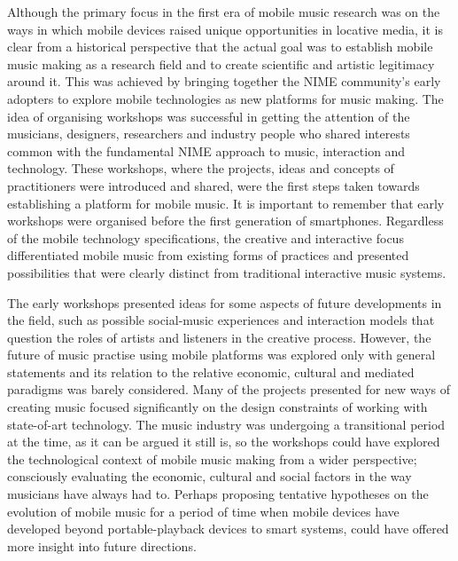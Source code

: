 Although the primary focus in the first era of mobile music research was on the ways in which mobile devices raised unique opportunities in locative media, it is clear from a historical perspective that the actual goal was to establish mobile music making as a research field and to create scientific and artistic legitimacy around it. This was  achieved by bringing together the NIME community's early adopters  to explore mobile technologies as new platforms for music making. The idea of organising workshops was successful in getting the attention of the musicians,  designers,  researchers and industry people  who shared interests common with the fundamental NIME approach to music, interaction and technology. These workshops, where the projects, ideas and concepts of practitioners were introduced and shared, were the first steps taken towards establishing a platform for mobile music. It is important to remember that early workshops were organised before the first generation of smartphones. Regardless of the mobile technology specifications, the creative and interactive focus  differentiated mobile music from existing forms of practices and presented possibilities that were clearly distinct from traditional interactive music systems.

The early workshops presented ideas for some aspects of future developments in the field, such as possible social-music experiences and interaction models that question the roles of artists and listeners in the creative process. However, the future of music practise using mobile platforms was explored only with general statements and its relation to the relative economic, cultural and mediated paradigms was barely considered. Many of the projects presented for new ways of creating music focused significantly on the design constraints of working with state-of-art technology. The music industry was undergoing a transitional period at the time, as it can be argued it still is, so the workshops could have explored the technological context of mobile music making from a wider perspective; consciously evaluating the economic, cultural and social factors in the way musicians have always had to. Perhaps proposing tentative hypotheses on the evolution of mobile music for a period of time when mobile devices have developed beyond portable-playback devices to smart systems, could have offered more insight into future directions.

